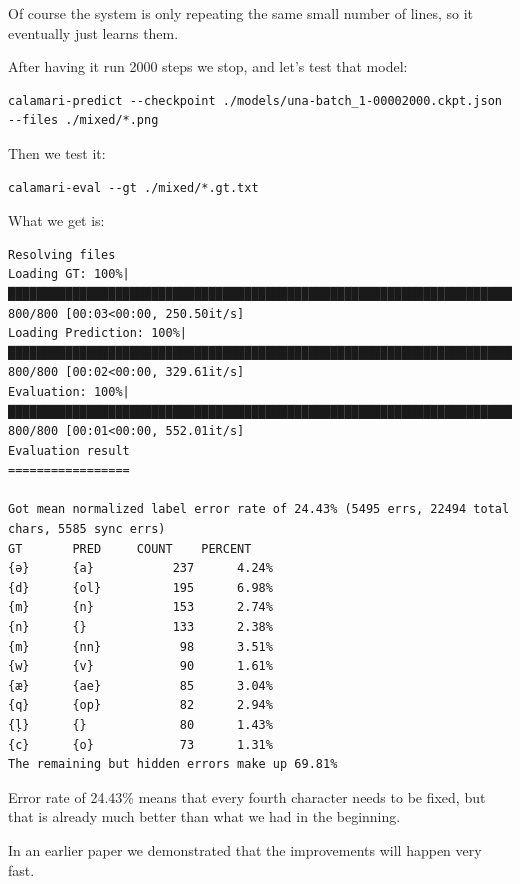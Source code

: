 \documentclass[]{book}
\begin{document}
Of course the system is only repeating the same small number of lines, so it eventually just learns them.

After having it run 2000 steps we stop, and let's test that model:

\begin{verbatim}
calamari-predict --checkpoint ./models/una-batch_1-00002000.ckpt.json --files ./mixed/*.png
\end{verbatim}

Then we test it:

\begin{verbatim}
calamari-eval --gt ./mixed/*.gt.txt
\end{verbatim}

What we get is:

\begin{verbatim}
Resolving files
Loading GT: 100%|███████████████████████████████████████████████████████████████████████████████████████| 800/800 [00:03<00:00, 250.50it/s]
Loading Prediction: 100%|███████████████████████████████████████████████████████████████████████████████| 800/800 [00:02<00:00, 329.61it/s]
Evaluation: 100%|███████████████████████████████████████████████████████████████████████████████████████| 800/800 [00:01<00:00, 552.01it/s]
Evaluation result
=================

Got mean normalized label error rate of 24.43% (5495 errs, 22494 total chars, 5585 sync errs)
GT       PRED     COUNT    PERCENT   
{ə}      {a}           237      4.24%
{d}      {ol}          195      6.98%
{m}      {n}           153      2.74%
{n}      {}            133      2.38%
{m}      {nn}           98      3.51%
{w}      {v}            90      1.61%
{æ}      {ae}           85      3.04%
{q}      {op}           82      2.94%
{ļ}      {}             80      1.43%
{c}      {o}            73      1.31%
The remaining but hidden errors make up 69.81%
\end{verbatim}

Error rate of 24.43\% means that every fourth character needs to be fixed, but that is already much better than what we had in the beginning.

In an earlier paper we demonstrated that the improvements will happen very fast.
\end{document}
